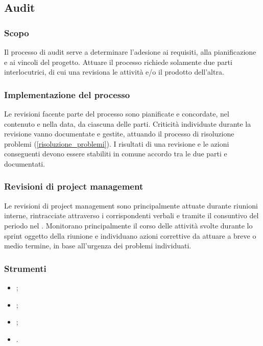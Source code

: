 \subsection{Audit}\label{audit}

\subsubsection{Scopo}
\par Il processo di audit serve a determinare l'adesione ai requisiti, alla pianificazione e ai vincoli del progetto. Attuare il processo richiede solamente due parti interlocutrici, di cui una revisiona le attività e/o il prodotto dell'altra.

\subsubsection{Implementazione del processo}
\par Le revisioni facente parte del processo sono pianificate e concordate, nel contenuto e nella data, da ciascuna delle parti. Criticità individuate durante la revisione vanno documentate e gestite, attuando il processo di risoluzione problemi (\ref{risoluzione_problemi}). I risultati di una revisione e le azioni conseguenti devono essere stabiliti in comune accordo tra le due parti e documentati.

\subsubsection{Revisioni di project management}
\par Le revisioni di project management sono principalmente attuate durante riunioni interne, rintracciate attraverso i corrispondenti verbali e tramite il consuntivo del periodo nel \PdP. Monitorano principalmente il corso delle attività svolte durante lo sprint oggetto della riunione e individuano azioni correttive da attuare a breve o medio termine, in base all'urgenza dei problemi individuati.

\subsubsection{Strumenti}
\begin{itemize}
  \item {};
  \item {};
  \item {};
  \item {}.
\end{itemize}
